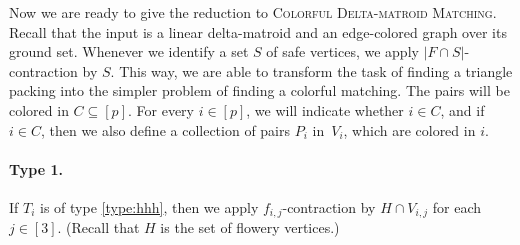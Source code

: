 Now we are ready to give the reduction to \textsc{Colorful Delta-matroid Matching}.
Recall that the input is a linear delta-matroid and an edge-colored graph over its ground set.
%
%
%
Whenever we identify a set $S$ of safe vertices,  we apply $|F \cap S|$-contraction by $S$.
This way, we are able to transform the task of finding a triangle packing into the simpler problem of finding a colorful matching.
The pairs will be colored in $C \subseteq [p]$.
For every $i \in [p]$, we will indicate whether $i \in C$, and if $i \in C$, then we also define a collection of pairs $P_i$ in~$V_{i}$, which are colored in $i$.

\paragraph*{Type 1.} If $T_i$ is of type \ref{type:hhh}, then we apply $f_{i,j}$-contraction by $H \cap V_{i,j}$ for each $j \in [3]$. (Recall that $H$ is the set of flowery vertices.)

